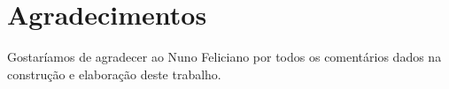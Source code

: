 \documentclass[a4paper, twocolumn, 11pt, twoside]{article}
\begin{document}

\section*{Agradecimentos}

Gostaríamos de agradecer ao Nuno Feliciano por todos os comentários dados na construção e elaboração deste trabalho. %


\end{document}
